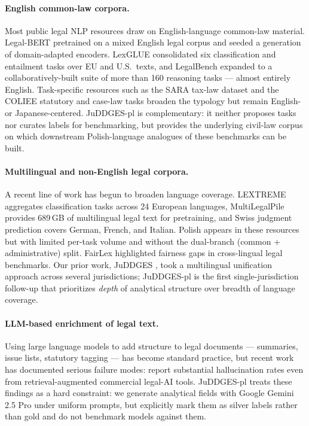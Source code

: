 \documentclass{article}
\begin{document}
\paragraph{English common-law corpora.} Most public legal NLP resources draw on English-language common-law material. Legal-BERT \citep{chalkidis2020legal} pretrained on a mixed English legal corpus and seeded a generation of domain-adapted encoders. LexGLUE \citep{chalkidis-etal-2022-lexglue} consolidated six classification and entailment tasks over EU and U.S.\ texts, and LegalBench \citep{guhaLegalbenchCollaborativelyBuilt2023a} expanded to a collaboratively-built suite of more than 160 reasoning tasks --- almost entirely English. Task-specific resources such as the SARA tax-law dataset \citep{holzenberger_dataset_2020} and the COLIEE statutory and case-law tasks \citep{rabelo_overview_2022} broaden the typology but remain English- or Japanese-centered. JuDDGES-pl is complementary: it neither proposes tasks nor curates labels for benchmarking, but provides the underlying civil-law corpus on which downstream Polish-language analogues of these benchmarks can be built.

\paragraph{Multilingual and non-English legal corpora.} A recent line of work has begun to broaden language coverage. LEXTREME \citep{niklaus2023lextreme} aggregates classification tasks across 24 European languages, MultiLegalPile \citep{niklaus2024multilegalpile689gbmultilinguallegal} provides 689\,GB of multilingual legal text for pretraining, and Swiss judgment prediction \citep{niklaus2023automatic} covers German, French, and Italian. Polish appears in these resources but with limited per-task volume and without the dual-branch (common + administrative) split. FairLex \citep{chalkidis2022fairlex} highlighted fairness gaps in cross-lingual legal benchmarks. Our prior work, JuDDGES \citep{augustyniak2024juddges}, took a multilingual unification approach across several jurisdictions; JuDDGES-pl is the first single-jurisdiction follow-up that prioritizes \emph{depth} of analytical structure over breadth of language coverage.

\paragraph{LLM-based enrichment of legal text.} Using large language models to add structure to legal documents --- summaries, issue lists, statutory tagging --- has become standard practice, but recent work has documented serious failure modes: \citet{magesh2024hallucinationlegalai} report substantial hallucination rates even from retrieval-augmented commercial legal-AI tools. JuDDGES-pl treats these findings as a hard constraint: we generate analytical fields with Google Gemini 2.5 Pro under uniform prompts, but explicitly mark them as silver labels rather than gold and do not benchmark models against them.
\end{document}
